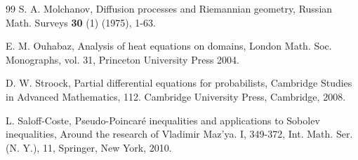 \documentclass{birkjour}
\begin{document}
\begin{thebibliography}{99}
\newblock S. A. Molchanov,
\newblock Diffusion processes and Riemannian geometry, 
\newblock Russian Math. Surveys \textbf{30} (1) (1975), 1-63. 
 
\newblock E. M. Ouhabaz,
\newblock Analysis of heat equations on domains, 
\newblock London Math. Soc. Monographs, vol. 31, Princeton University Press 2004.
 
 \newblock D. W. Stroock,
 \newblock Partial differential equations for probabilists,  
 \newblock Cambridge Studies in Advanced Mathematics, 112. Cambridge University Press, Cambridge, 2008. 
 
\newblock L. Saloff-Coste,
\newblock Pseudo-Poincar\'e inequalities and applications to Sobolev inequalities,
 \newblock Around the research of Vladimir Maz'ya. I, 349-372, Int. Math. Ser. (N. Y.), 11, Springer, New York, 2010. 

 
\end{thebibliography}

\medskip
\medskip
\end{document}
